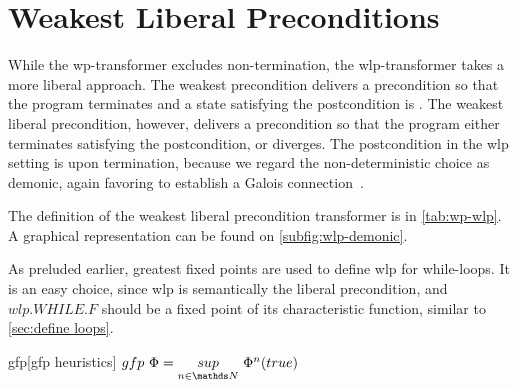 











\section{Weakest Liberal Preconditions}\label{sec:wlp}
While the wp-transformer excludes non-termination, the wlp-transformer takes a more liberal approach. 
The weakest precondition delivers a precondition so that the program terminates and a state satisfying the postcondition is . 
The weakest liberal precondition, however, delivers a precondition so that the program either terminates satisfying the postcondition, or diverges. 
The postcondition in the wlp setting is  upon termination, because we regard the non-deterministic choice as demonic, again favoring to establish a Galois connection~\cite{zhang22}. 

The definition of the weakest liberal precondition transformer is in \autoref{tab:wp-wlp}. 
A graphical representation can be found on \autoref{subfig:wlp-demonic}. 

As preluded earlier, greatest fixed points are used to define wlp for while-loops. 
It is an easy choice, since wlp is semantically the  liberal precondition, and $wlp.WHILE.F$ should be a fixed point of its characteristic function, similar to \autoref{sec:define loops}. 

\begin{theorem}{gfp}{\normalfont\cite{kaminski19}}[gfp heuristics]
  $gfp\ \Phi = \underset{n\in\N}{sup}\ \Phi^n(true)$
\end{theorem}





